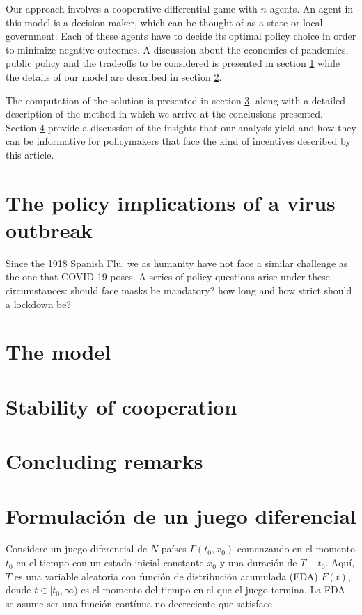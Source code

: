 \documentclass[11pt, oneside]{article}
\begin{document}
Our approach involves a cooperative differential game with $n$ agents. An agent in this model is a decision maker, which can be thought of as a state or local government. Each of these agents have to decide its optimal policy choice in order to minimize negative outcomes. A discussion about the economics of pandemics, public policy and the tradeoffs to be considered is presented in section \ref{Policy} while the details of our model are described in section \ref{model}.

The computation of the solution is presented in section \ref{IDP}, along with a detailed description of the method in which we arrive at the conclusions presented. Section \ref{Conclude} provide a discussion of the insights that our analysis yield and how they can be informative for policymakers that face the kind of incentives described by this article.


\section{The policy implications of a virus outbreak}\label{Policy}
Since the 1918 Spanish Flu, we as humanity have not face a similar challenge as the one that COVID-19 poses. A series of policy questions arise under these circumstances: should face masks be mandatory? how long and how strict should a lockdown be?


\section{The model} \label{model}


\section{Stability of cooperation}\label{IDP}

\section{Concluding remarks} \label{Conclude}

\section{Formulación de un juego diferencial}

Considere un juego diferencial de $N$ países $\Gamma(t_0,x_0)$ comenzando en el momento $t_0$ en el tiempo con un estado inicial constante $x_0$ y una duración de $T-t_0$. Aquí, $T$ es una variable aleatoria con función de distribución acumulada (FDA) $F(t)$, donde $t\in[t_0,\infty)$ es el momento del tiempo en el que el juego termina. La FDA se asume ser una función contínua no decreciente que satisface
\end{document}
